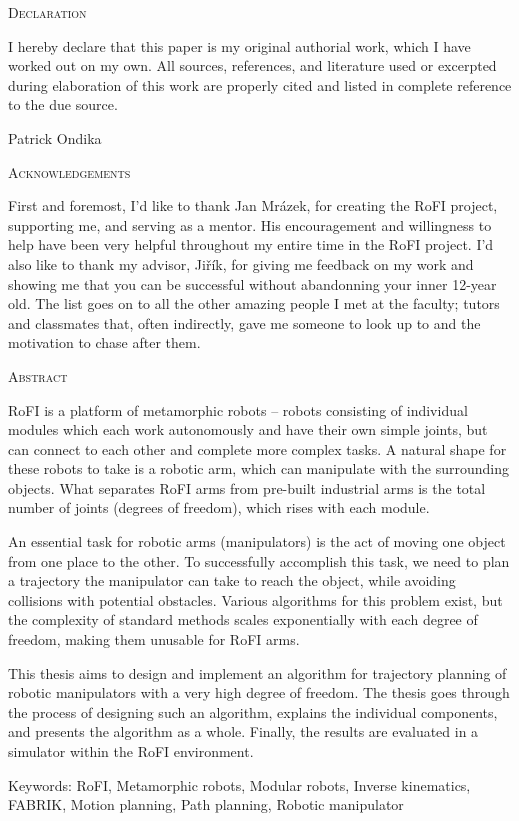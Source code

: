 \begin{center}
  \textsc{Declaration}
\end{center}

\noindent

I hereby declare that this paper is my original authorial work, which
I have worked out on my own. All sources, references, and literature
used or excerpted during elaboration of this work are properly cited
and listed in complete reference to the due source.

\hspace*{\fill} Patrick Ondika

\newpage

\begin{center}
  \textsc{Acknowledgements}
\end{center}

\noindent

First and foremost, I'd like to thank Jan Mrázek, for creating the RoFI project, supporting me, and serving as a mentor. His encouragement and willingness to help have been very helpful throughout my entire time in the RoFI project. I'd also like to thank my advisor, Jiřík, for giving me feedback on my work and showing me that you can be successful without abandonning your inner 12-year old. The list goes on to all the other amazing people I met at the faculty; tutors and classmates that, often indirectly, gave me someone to look up to and the motivation to chase after them.

\newpage

\begin{center}
  \textsc{Abstract}
\end{center}
%
\noindent
%
RoFI is a platform of metamorphic robots -- robots consisting of individual modules which each work autonomously and have their own simple joints, but can connect to each other and complete more complex tasks. A natural shape for these robots to take is a robotic arm, which can manipulate with the surrounding objects. What separates RoFI arms from pre-built industrial arms is the total number of joints (degrees of freedom), which rises with each module.

An essential task for robotic arms (manipulators) is the act of moving one object from one place to the other. To successfully accomplish this task, we need to plan a trajectory the manipulator can take to reach the object, while avoiding collisions with potential obstacles. Various algorithms for this problem exist, but the complexity of standard methods scales exponentially with each degree of freedom, making them unusable for RoFI arms.

This thesis aims to design and implement an algorithm for trajectory planning of robotic manipulators with a very high degree of freedom. The thesis goes through the process of designing such an algorithm, explains the individual components, and presents the algorithm as a whole. Finally, the results are evaluated in a simulator within the RoFI environment.

\vfill
Keywords: RoFI, Metamorphic robots, Modular robots, Inverse kinematics, FABRIK, Motion planning, Path planning, Robotic manipulator
